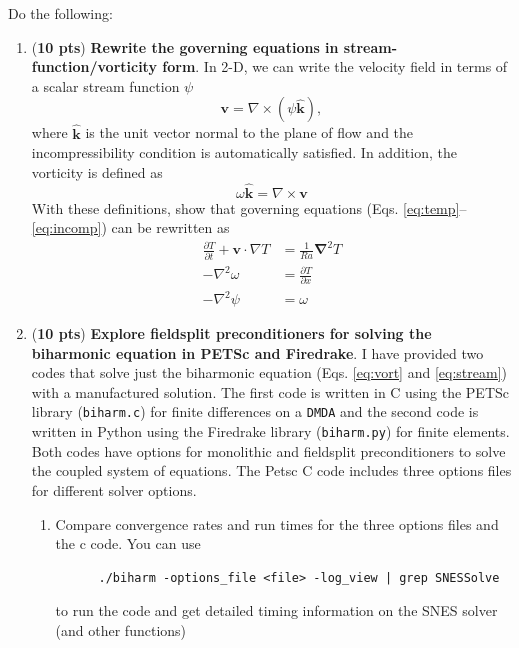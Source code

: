 \documentclass[11pt]{article}
\begin{document}
Do the following:
\begin{enumerate}
  \item (\textbf{10 pts}) \textbf{Rewrite the governing equations in stream-function/vorticity form}. In 2-D,  we can write the velocity field in terms of a scalar stream function $\psi$ 
  \begin{displaymath} 
    \mathbf{v} = \nabla \times (\psi \hat{\mathbf{k}}),
  \end{displaymath}
   where $\hat{\mathbf{k}}$ is the unit vector normal to the plane of flow and the incompressibility condition is automatically satisfied.  In addition, the vorticity is defined as 
   \begin{displaymath}
     \omega \hat{\mathbf{k}}= \nabla \times \mathbf{v}
   \end{displaymath}
    With these definitions, show that governing equations (Eqs. \ref{eq:temp}--\ref{eq:incomp}) can be rewritten as 
    \begin{align}
      \frac{\partial T}{\partial t} + \mathbf{v} \cdot \nabla T & = \frac{1}{Ra}\mathbf{\nabla}^2 T  \label{eq:temp2}\\
      -\nabla^2\omega & = \frac{\partial T}{\partial x} \label{eq:vort} \\
      -\nabla^2 \psi & = \omega \label{eq:stream}
    \end{align}
  \item (\textbf{10 pts}) \textbf{Explore fieldsplit preconditioners for solving the  biharmonic equation in PETSc and Firedrake}. I have provided two codes that solve just the biharmonic equation (Eqs. \eqref{eq:vort} and \eqref{eq:stream}) with a manufactured solution. The first code is written in C using the PETSc library (\texttt{biharm.c}) for finite differences on a \texttt{DMDA} and the second code is written in Python using the Firedrake library (\texttt{biharm.py}) for finite elements. Both codes have options for monolithic and  fieldsplit preconditioners to solve the coupled system of equations.  The Petsc C code includes three options files for different solver options. 
  \begin{enumerate}
    \item Compare convergence rates and run times for the three options files and the c code. You can use 
    \begin{verbatim}   
      ./biharm -options_file <file> -log_view | grep SNESSolve
    \end{verbatim}
    to run the code and get detailed timing information on the SNES solver (and other functions) 

\end{enumerate}
\end{enumerate}
\end{document}
